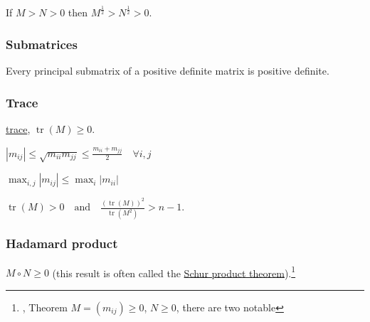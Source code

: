 {{{{{{{{{{{{{{{{If \(M > N > 0\) then \(M^\frac{1}{2} > N^\frac{1}{2} > 0\).

\hypertarget{submatrices}{%
\subsubsection{Submatrices}\label{submatrices}}

Every principal submatrix of a positive definite matrix is positive
definite.

\hypertarget{trace}{%
\subsubsection{Trace}\label{trace}}
%
\href{trace_(linear_algebra)}{trace}, \(\operatorname{tr}(M) \ge 0\).
%
\begin{description}
\item
\(\left|m_{ij}\right| \leq \sqrt{m_{ii}m_{jj}} \leq \frac{m_{ii} + m_{jj}}{2} \quad \forall i, j\)
\end{description}
%
%
\begin{description}
\item
\(\max_{i,j} \left|m_{ij}\right| \leq \max_i\left|m_{ii}\right|\)
\end{description}
%
%
\begin{description}
\item
\(\operatorname{tr}(M) > 0  \quad \mathrm{and} \quad \frac{(\operatorname{tr}(M))^2}{\operatorname{tr}(M^2)} > n-1.\)
\end{description}

\hypertarget{hadamard-product}{%
\subsubsection{Hadamard product}\label{hadamard-product}}
%
\(M \circ N \geq 0\) (this result is often called the
\href{Schur_product_theorem}{Schur product theorem}).\footnote{, Theorem
%
\(M = (m_{ij}) \geq 0\), \(N \geq 0\), there are two notable
%

}}}}}}}}}}}}}}}}}
